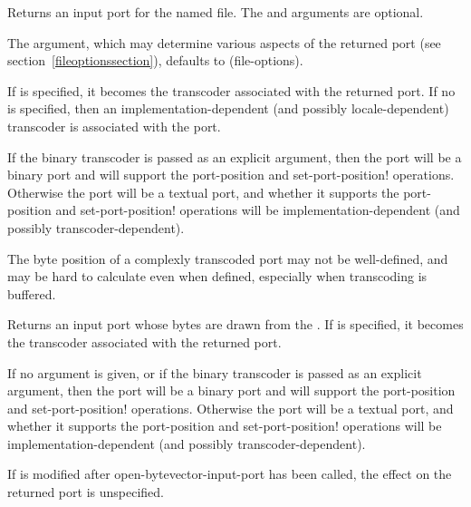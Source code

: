 \begin{entry}{%
}
   
Returns an input port for the named file. The  and
 arguments are optional.

The  argument, which may determine
various aspects of the returned port (see section~\ref{fileoptionssection}),
defaults to {\cf (file-options)}.

If  is specified, it becomes the transcoder associated
with the returned port.
If no  is specified, then an implementation-dependent
(and possibly locale-dependent) transcoder is associated with the port.

If the binary transcoder is passed as an explicit argument,
then the port will be a binary port and will support the
{\cf port-position} and {\cf set-port-position!}  operations.
Otherwise the port will be a textual port, and whether it supports
the {\cf port-position} and {\cf set-port-position!} operations
will be implementation-dependent (and possibly transcoder-dependent).

\begin{rationale}
  The byte position of a complexly transcoded port may not be
  well-defined, and may be hard to calculate even when defined,
  especially when transcoding is buffered.
\end{rationale}
\end{entry}

\begin{entry}{%
}
   
Returns an input port whose bytes are drawn from the
.
If  is specified, it becomes the transcoder associated
with the returned port.

If no  argument is given, or
if the binary transcoder is passed as an explicit argument,
then the port will be a binary port and will support the
{\cf port-position} and {\cf set-port-position!}  operations.
Otherwise the port will be a textual port, and whether it supports
the {\cf port-position} and {\cf set-port-position!} operations
will be implementation-dependent (and possibly transcoder-dependent).

If  is modified after {\cf open-\linebreak[0]bytevector-\linebreak[0]input-\linebreak[0]port}
has been called, the effect on the returned
port is unspecified.
\end{entry}

